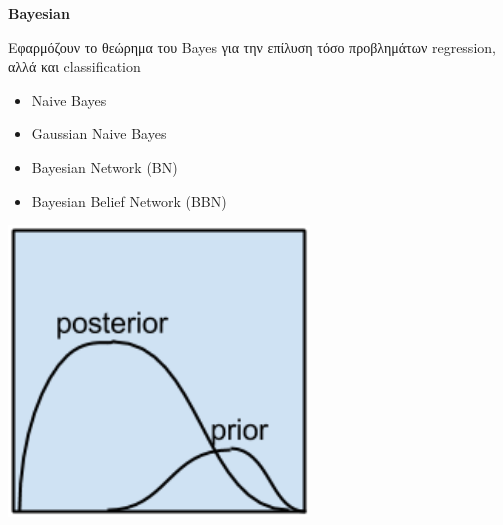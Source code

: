 \begin{minipage}{0.5\textwidth}

  \textbf{\large Bayesian}

  Εφαρμόζουν το θεώρημα του Bayes για την επίλυση τόσο προβλημάτων regression, αλλά και classification
  \begin{itemize}
    \setlength\itemsep{0em}
    \item{Naive Bayes}
    \item{Gaussian Naive Bayes}
    \item{Bayesian Network (BN)}
    \item{Bayesian Belief Network (BBN)}
  \end{itemize}
\end{minipage}
\begin{minipage}{0.5\textwidth}
  \begin{center}
    \includegraphics[width=0.6\textwidth]{./images/chapter3/bayesian_algorithms.png}
  \end{center}
\end{minipage}

